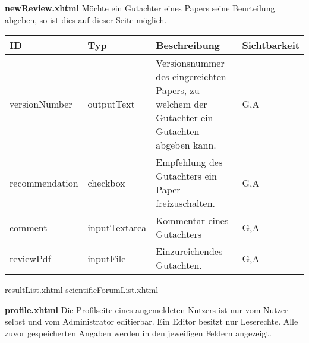 \textbf{newReview.xhtml} Möchte ein Gutachter eines Papers seine Beurteilung abgeben, so ist dies auf dieser Seite möglich.

\begin{tabular}{|m{2cm}|m{3cm}|m{6cm}|m{2.5cm}|}
    \hline
    \textbf{ID} & \textbf{Typ} & \textbf{Beschreibung} & \textbf{Sichtbarkeit} \\
    \hline
    \hline
    versionNumber & outputText & Versionsnummer des eingereichten Papers, zu welchem der Gutachter ein Gutachten abgeben kann. & G,A\\
    \hline
    recommendation & checkbox & Empfehlung des Gutachters ein Paper freizuschalten. & G,A\\
    \hline
    comment & inputTextarea & Kommentar eines Gutachters & G,A\\
    \hline
    reviewPdf & inputFile & Einzureichendes Gutachten. & G,A \\
    \hline
\end{tabular}


resultList.xhtml
scientificForumList.xhtml

\textbf{profile.xhtml} Die Profilseite eines angemeldeten Nutzers ist nur vom Nutzer selbst und vom Administrator editierbar.
Ein Editor besitzt nur Leserechte. Alle zuvor gespeicherten Angaben werden in den jeweiligen Feldern angezeigt.

